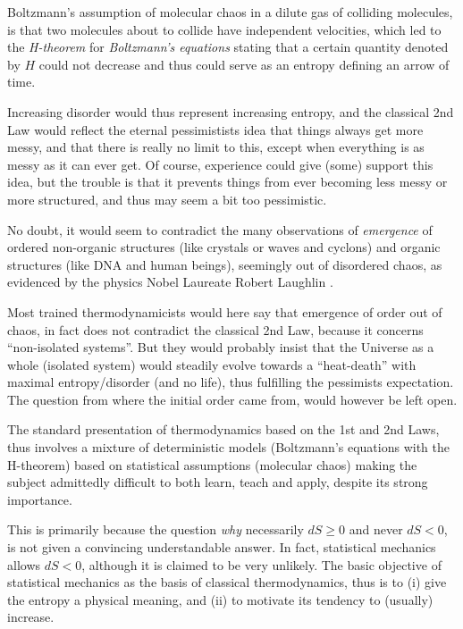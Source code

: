 Boltzmann's assumption of molecular chaos in a dilute gas of colliding
molecules, is that two molecules about to collide have
independent velocities, which led to the \emph{H-theorem} 
for \emph{Boltzmann's equations} stating that a certain quantity
denoted by $H$ could not decrease and thus could serve as
an entropy defining an arrow of time.
 
Increasing disorder would thus represent increasing entropy, and the
classical 2nd Law would reflect the eternal pessimistists idea that things 
always get more messy, and 
that there is really no limit to this,
except when everything is as messy as it can ever get. Of course, experience
could give (some) support this idea, but the trouble is that it prevents things
from ever becoming less messy or more structured, and 
thus may seem a bit too pessimistic.

No doubt, it would seem to contradict the many observations of 
\emph{emergence} of ordered non-organic structures (like crystals or
waves and cyclons) and organic structures (like DNA and human beings), 
seemingly out of disordered chaos, as evidenced by the physics
Nobel Laureate Robert Laughlin \cite{laughlin}.


Most trained thermodynamicists
would here say that emergence of order
out of chaos, in fact does not contradict the classical 2nd Law, 
because it concerns 
``non-isolated systems''. But they would probably insist that  
the Universe as a whole (isolated system) would steadily evolve towards a   
``heat-death'' with maximal entropy/disorder (and no life), thus
fulfilling the pessimists expectation. The question from where the
initial order came from, would however be left open.

The standard presentation of thermodynamics based on the 
1st and 2nd Laws, thus involves a mixture of deterministic 
models (Boltzmann's equations with the H-theorem) based on
statistical assumptions (molecular chaos) making the subject
admittedly difficult to both learn, teach and apply, 
despite its strong importance. 

This is primarily because the question \emph{why} necessarily $dS\ge 0$ and never $dS<0$, is not
given a convincing understandable answer. 
In fact, statistical mechanics allows 
$dS<0$, although it is claimed to be very unlikely. The basic objective
of statistical mechanics as the basis of classical thermodynamics,
thus is to (i) give the entropy a physical meaning, and (ii) to motivate
its tendency to (usually) increase. 

